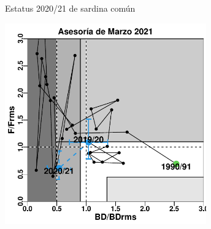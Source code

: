 \documentclass[
  ignorenonframetext,
]{beamer}
\begin{document}
\begin{frame}{Estatus 2020/21 de sardina común}
\protect\hypertarget{estatus-202021-de-sardina-comuxfan}{}
\begin{center}
\includegraphics[width=0.65\textwidth]{FigurasInforme_Marzo/Fig41_DFmarzo-1.pdf}
\end{center}
\end{frame}
\end{document}
